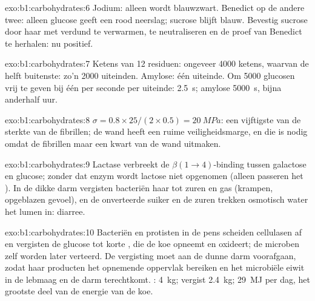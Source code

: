 \begin{solution}{exo:b1:carbohydrates:6}
Jodium: alleen  wordt blauwzwart. Benedict op de andere twee: alleen
glucose geeft een rood neerslag; sucrose blijft blauw. Bevestig sucrose door haar
met verdund  te verwarmen, te neutraliseren en de proef van Benedict te
herhalen: nu positief.
\end{solution}

\begin{solution}{exo:b1:carbohydrates:7}
Ketens van 12 residuen: ongeveer \num{4000} ketens, waarvan de helft buitenste:
zo'n \num{2000} uiteinden. Amylose: één uiteinde. Om \num{5000} glucosen vrij te
geven bij één per seconde per uiteinde:  \qty{2.5}{s}; amylose
\qty{5000}{s}, bijna anderhalf uur.
\end{solution}

\begin{solution}{exo:b1:carbohydrates:8}
$\sigma = 0.8\times 25/(2\times 0.5) = \qty{20}{MPa}$: een vijftigste van de
sterkte van de fibrillen; de wand heeft een ruime veiligheidsmarge, en die is
nodig omdat de fibrillen maar een kwart van de wand uitmaken.
\end{solution}

\begin{solution}{exo:b1:carbohydrates:9}
Lactase verbreekt de $\beta(1{\to}4)$-binding tussen galactose en glucose; zonder
dat enzym wordt lactose niet opgenomen (alleen  passeren het
). In de dikke darm vergisten bacteriën haar tot zuren en gas (krampen,
opgeblazen gevoel), en de onverteerde suiker en de zuren trekken osmotisch water
het lumen in: diarree.
\end{solution}

\begin{solution}{exo:b1:carbohydrates:10}
Bacteriën en protisten in de pens scheiden cellulasen af en vergisten de glucose
tot korte , die de koe opneemt en oxideert; de microben zelf worden later
verteerd. De vergisting moet aan de dunne darm voorafgaan, zodat haar producten
het opnemende oppervlak bereiken en het microbiële eiwit in de lebmaag en de darm
terechtkomt. : \qty{4}{kg}; vergist \qty{2.4}{kg}; \qty{29}{MJ} per dag,
het grootste deel van de energie van de koe.
\end{solution}

